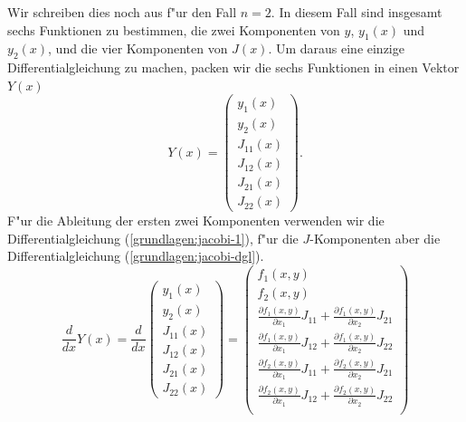 Wir schreiben dies noch aus f"ur den Fall $n=2$.
In diesem Fall sind insgesamt sechs Funktionen zu bestimmen, die
zwei Komponenten von $y$, $y_1(x)$ und $y_2(x)$, und die vier
Komponenten von $J(x)$.
Um daraus eine einzige Differentialgleichung zu machen, packen wir
die sechs Funktionen in einen Vektor $Y(x)$
\[
Y(x)=
\begin{pmatrix}
y_1(x)\\
y_2(x)\\
J_{11}(x)\\
J_{12}(x)\\
J_{21}(x)\\
J_{22}(x)
\end{pmatrix}.
\]
F"ur die Ableitung der ersten zwei Komponenten verwenden wir die
Differentialgleichung (\ref{grundlagen:jacobi-1}), f"ur die $J$-Komponenten
aber die Differentialgleichung (\ref{grundlagen:jacobi-dgl}).
\begin{equation}
\frac{d}{dx}Y(x)
=
\frac{d}{dx}
\begin{pmatrix}
y_1(x)\\
y_2(x)\\
J_{11}(x)\\
J_{12}(x)\\
J_{21}(x)\\
J_{22}(x)
\end{pmatrix}
=
\begin{pmatrix}
f_1(x,y)\\
f_2(x,y)\\
\displaystyle
\frac{\partial f_1(x,y)}{\partial x_1} J_{11}
	+\frac{\partial f_1(x,y)}{\partial x_2} J_{21}\\
\displaystyle
\frac{\partial f_1(x,y)}{\partial x_1} J_{12}
	+\frac{\partial f_1(x,y)}{\partial x_2} J_{22}\\
\displaystyle
\frac{\partial f_2(x,y)}{\partial x_1} J_{11}
	+\frac{\partial f_2(x,y)}{\partial x_2} J_{21}\\
\displaystyle
\frac{\partial f_2(x,y)}{\partial x_1} J_{12}
	+\frac{\partial f_2(x,y)}{\partial x_2} J_{22}\\
\end{pmatrix}
\end{equation}

